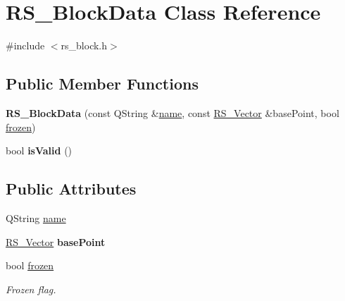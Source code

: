 \hypertarget{classRS__BlockData}{\section{R\-S\-\_\-\-Block\-Data Class Reference}
\label{classRS__BlockData}
}


{\ttfamily \#include $<$rs\-\_\-block.\-h$>$}

\subsection*{Public Member Functions}
\begin{DoxyCompactItemize}
\item 
\hypertarget{classRS__BlockData_af1e4f92f9dc47e1d0465b1d7ae4c83ca}{{\bfseries R\-S\-\_\-\-Block\-Data} (const Q\-String \&\hyperlink{classRS__BlockData_aab3251685c8c1e3ceb0b24d1f0b0c333}{name}, const \hyperlink{classRS__Vector}{R\-S\-\_\-\-Vector} \&base\-Point, bool \hyperlink{classRS__BlockData_af39bcee20f02c196357a8fe84104cf1d}{frozen})}\label{classRS__BlockData_af1e4f92f9dc47e1d0465b1d7ae4c83ca}

\item 
\hypertarget{classRS__BlockData_aad39b288f978ceeae9ae4d0aac5a2e31}{bool {\bfseries is\-Valid} ()}\label{classRS__BlockData_aad39b288f978ceeae9ae4d0aac5a2e31}

\end{DoxyCompactItemize}
\subsection*{Public Attributes}
\begin{DoxyCompactItemize}
\item 
Q\-String \hyperlink{classRS__BlockData_aab3251685c8c1e3ceb0b24d1f0b0c333}{name}
\item 
\hypertarget{classRS__BlockData_a48e8b52396213dc65ceecd452404d918}{\hyperlink{classRS__Vector}{R\-S\-\_\-\-Vector} {\bfseries base\-Point}}\label{classRS__BlockData_a48e8b52396213dc65ceecd452404d918}

\item 
\hypertarget{classRS__BlockData_af39bcee20f02c196357a8fe84104cf1d}{bool \hyperlink{classRS__BlockData_af39bcee20f02c196357a8fe84104cf1d}{frozen}}\label{classRS__BlockData_af39bcee20f02c196357a8fe84104cf1d}

\begin{DoxyCompactList}\small\item\em Frozen flag. \end{DoxyCompactList}\end{DoxyCompactItemize}


